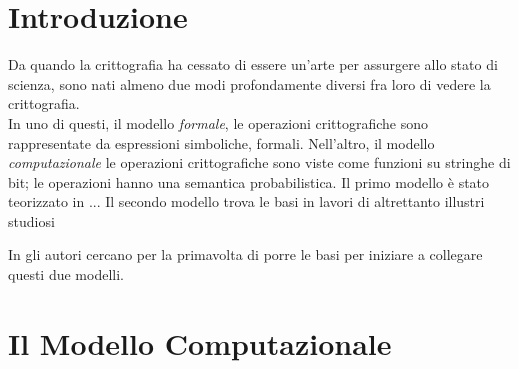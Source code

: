 \documentclass[a4paper,openright,twoside,12pt]{report}
\author{Gian Pietro Farina}
\begin{document}
\chapter{Introduzione}

Da quando la crittografia ha cessato di essere un'arte per assurgere allo stato di scienza\cite{diffiehelmann77}, sono nati almeno due modi profondamente diversi fra loro di
vedere la crittografia.\\In uno di questi, il modello \emph{formale}, le operazioni crittografiche sono rappresentate da espressioni simboliche, formali.
Nell'altro, il modello \emph{computazionale} le operazioni crittografiche sono viste come funzioni su stringhe di bit; le operazioni hanno una semantica probabilistica.
Il primo modello \`e stato teorizzato in \cite{}...
Il secondo modello trova le basi in lavori di altrettanto illustri studiosi \cite{}

In \cite{DBLP:journals/joc/AbadiR07} gli autori cercano per la primavolta di porre le basi per iniziare a collegare questi due modelli.


\chapter{Il Modello Computazionale}
\end{document}
